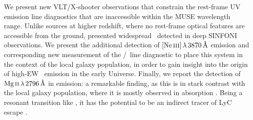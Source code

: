 We present new VLT/X-shooter observations that constrain the rest-frame UV emission line diagnostics that are inaccessible within the MUSE wavelength range. Unlike sources at higher redshift, where no rest-frame optical features are accessible from the ground, \citet{2007MNRAS.376..479S} presented widespread \OII\ detected in deep SINFONI observations. We present the additional detection of $\NeIII \, \lambda \, 3870 \, \Angstrom$ emission and corresponding new measurement of the \NeIII/\OII\ line diagnostic to place this system in the context of the local galaxy population, in order to gain insight into the origin of high-EW \CIV\ emission in the early Universe. Finally, we report the detection of $\MgII \, \lambda \, 2796 \, \Angstrom$ in emission: a remarkable finding, as this is in stark contrast with the local galaxy population, where it is mostly observed in absorption \citep[e.g.][]{1993ApJS...86....5K}. Being a resonant transition like \lya, it has the potential to be an indirect tracer of LyC escape \citep[e.g.][]{2018ApJ...855...96H}.

